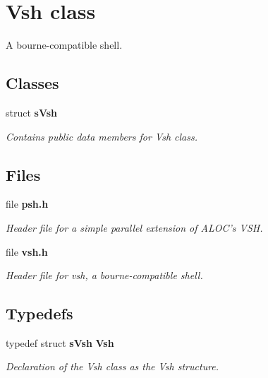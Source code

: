 \section{Vsh class}
\label{a00027}


A bourne-\/compatible shell.  


\subsection*{Classes}
\begin{DoxyCompactItemize}
\item 
struct {\bf sVsh}
\begin{DoxyCompactList}\small\item\em Contains public data members for Vsh class. \item\end{DoxyCompactList}\end{DoxyCompactItemize}
\subsection*{Files}
\begin{DoxyCompactItemize}
\item 
file {\bf psh.h}


\begin{DoxyCompactList}\small\item\em Header file for a simple parallel extension of ALOC's VSH. \item\end{DoxyCompactList}

\item 
file {\bf vsh.h}


\begin{DoxyCompactList}\small\item\em Header file for vsh, a bourne-\/compatible shell. \item\end{DoxyCompactList}

\end{DoxyCompactItemize}
\subsection*{Typedefs}
\begin{DoxyCompactItemize}
\item 
typedef struct {\bf sVsh} {\bf Vsh}
\begin{DoxyCompactList}\small\item\em Declaration of the Vsh class as the Vsh structure. \item\end{DoxyCompactList}\end{DoxyCompactItemize}
